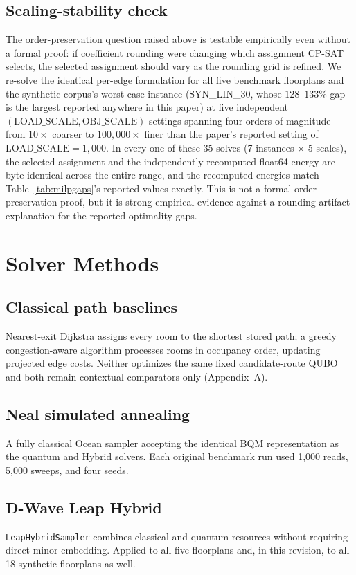 \documentclass[11pt]{article}
\begin{document}
\subsection{Scaling-stability check}
\label{sec:scalingstability}
The order-preservation question raised above is testable empirically even without a formal proof: if coefficient rounding were changing which assignment CP-SAT selects, the selected assignment should vary as the rounding grid is refined. We re-solve the identical per-edge formulation for all five benchmark floorplans and the synthetic corpus's worst-case instance (SYN\_LIN\_30, whose $128$--$133\%$ gap is the largest reported anywhere in this paper) at five independent $(\text{LOAD\_SCALE}, \text{OBJ\_SCALE})$ settings spanning four orders of magnitude -- from $10\times$ coarser to $100{,}000\times$ finer than the paper's reported setting of $\text{LOAD\_SCALE}=1{,}000$. In every one of these 35 solves (7 instances $\times$ 5 scales), the selected assignment and the independently recomputed float64 energy are byte-identical across the entire range, and the recomputed energies match Table~\ref{tab:milpgaps}'s reported values exactly. This is not a formal order-preservation proof, but it is strong empirical evidence against a rounding-artifact explanation for the reported optimality gaps.

\section{Solver Methods}

\subsection{Classical path baselines}
Nearest-exit Dijkstra assigns every room to the shortest stored path; a greedy congestion-aware algorithm processes rooms in occupancy order, updating projected edge costs. Neither optimizes the same fixed candidate-route QUBO and both remain contextual comparators only (Appendix~A).

\subsection{Neal simulated annealing}
A fully classical Ocean sampler accepting the identical BQM representation as the quantum and Hybrid solvers. Each original benchmark run used 1,000 reads, 5,000 sweeps, and four seeds.

\subsection{D-Wave Leap Hybrid}
\texttt{LeapHybridSampler} combines classical and quantum resources without requiring direct minor-embedding. Applied to all five floorplans and, in this revision, to all 18 synthetic floorplans as well.
\end{document}
